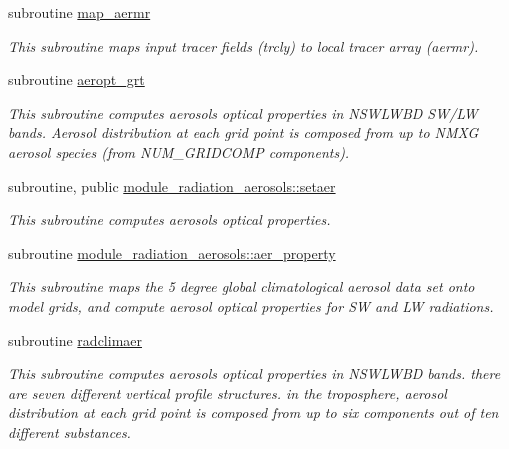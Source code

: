 \begin{DoxyCompactItemize}
subroutine \hyperlink{radiation__aerosols_8f_a651c4be2fa354238990c5c7b9488e9fd}{map\+\_\+aermr}
\begin{DoxyCompactList}\small\item\em This subroutine maps input tracer fields (trcly) to local tracer array (aermr). \end{DoxyCompactList}\item 
subroutine \hyperlink{radiation__aerosols_8f_a4ff866c545425e7029a11999e97d8faa}{aeropt\+\_\+grt}
\begin{DoxyCompactList}\small\item\em This subroutine computes aerosols optical properties in N\+S\+W\+L\+W\+BD S\+W/\+LW bands. Aerosol distribution at each grid point is composed from up to N\+M\+XG aerosol species (from N\+U\+M\+\_\+\+G\+R\+I\+D\+C\+O\+MP components). \end{DoxyCompactList}\end{DoxyCompactItemize}
{\bf }\par
\begin{DoxyCompactItemize}
\item 
subroutine, public \hyperlink{namespacemodule__radiation__aerosols_a94a9a162f822d2ee5c5bff611403dd06}{module\+\_\+radiation\+\_\+aerosols\+::setaer}                                                                                               
\begin{DoxyCompactList}\small\item\em This subroutine computes aerosols optical properties. \end{DoxyCompactList}\end{DoxyCompactItemize}

{\bf }\par
\begin{DoxyCompactItemize}
\item 
subroutine \hyperlink{namespacemodule__radiation__aerosols_a0c8525abbb12f5f03e3c136c851c11bd}{module\+\_\+radiation\+\_\+aerosols\+::aer\+\_\+property}                                                                                   
\begin{DoxyCompactList}\small\item\em This subroutine maps the 5 degree global climatological aerosol data set onto model grids, and compute aerosol optical properties for SW and LW radiations. \end{DoxyCompactList}\item 
subroutine \hyperlink{radiation__aerosols_8f_ae60b55ebc37825b2c3c95f95b23ed558}{radclimaer}
\begin{DoxyCompactList}\small\item\em This subroutine computes aerosols optical properties in N\+S\+W\+L\+W\+BD bands. there are seven different vertical profile structures. in the troposphere, aerosol distribution at each grid point is composed from up to six components out of ten different substances. \end{DoxyCompactList}\end{DoxyCompactItemize}

